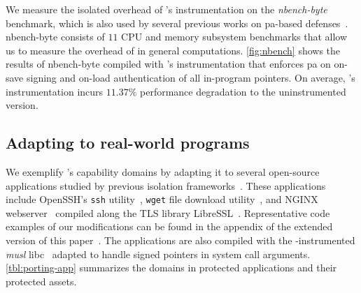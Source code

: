 {}
\label{sec:evaluation:nbench}
We measure the isolated overhead of \thename's instrumentation on the \emph{nbench-byte}~\cite{nbench} benchmark, which is also used by several previous works on \gls{pa}-based defenses~\cite{pactight,pac-it-up}.
nbench-byte consists of $11$ CPU and memory subsystem benchmarks that allow us to measure the overhead of \thename in general computations.
\autoref{fig:nbench} shows the results of nbench-byte compiled with \thename's instrumentation that enforces \gls{pa} on on-save signing and on-load authentication of all in-program pointers.
On average, \thename's instrumentation incurs $11.37\%$ performance degradation to the uninstrumented version.


% 








\subsection{Adapting \thename to real-world programs}
We exemplify \thename's capability domains by adapting it to several open-source applications studied by previous isolation frameworks~\cite{erim,chen2016shreds,ptrsplit}.
These applications include OpenSSH's \texttt{ssh} utility~\cite{openssh}, \texttt{wget} file download utility~\cite{wget}, and NGINX webserver~\cite{nginx} compiled along the TLS library LibreSSL~\cite{libressl}.
Representative code examples of our modifications can be found in the appendix of the extended version of this paper~\cite{capacity-extended}.
The applications are also compiled with the \thename-instrumented \emph{musl} libc~\cite{musl} adapted to handle signed pointers in system call arguments.
\autoref{tbl:porting-app} summarizes the \thename domains in protected applications and their protected assets.


